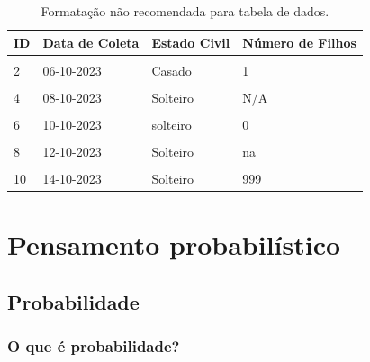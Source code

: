 \documentclass[
]{book}
\begin{document}
\begin{table}

\caption{\label{tab:tabela-evite}Formatação não recomendada para tabela de dados.}
\centering
\begin{tabu} to 
\toprule
\textbf{ID} & \textbf{Data de Coleta} & \textbf{Estado Civil} & \textbf{Número de Filhos}\\
\midrule
{} &  &  & \\
2 & 06-10-2023 & Casado & 1\\
 &  &  & \\
4 & 08-10-2023 & Solteiro & N/A\\
 &  &  & \\
6 & 10-10-2023 & solteiro & 0\\
 &  &  & \\
8 & 12-10-2023 & Solteiro & na\\
 &  &  & \\
10 & 14-10-2023 & Solteiro & 999\\
\bottomrule
\end{tabu}
\end{table}

\hypertarget{pensamento-probabilistico}{%
\chapter{\texorpdfstring{\textbf{Pensamento probabilístico}}{Pensamento probabilístico}}\label{pensamento-probabilistico}}

\hypertarget{probabilidade}{%
\section{Probabilidade}\label{probabilidade}}

\hypertarget{o-que-uxe9-probabilidade}{%
\subsection{O que é probabilidade?}\label{o-que-uxe9-probabilidade}}
\end{document}

